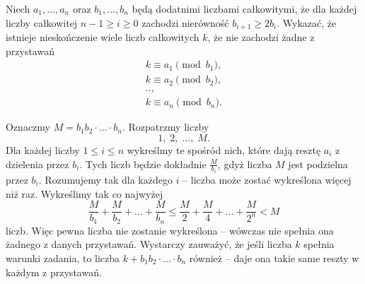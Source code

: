 \begin{problem}{6}
	Niech $a_1, ..., a_n$ oraz $b_1, ..., b_n$ będą dodatnimi liczbami całkowitymi, że dla każdej liczby całkowitej $n - 1\geqslant i \geqslant 0$ zachodzi nierówność $b_{i + 1} \geqslant 2b_{i}$. Wykazać, że istnieje nieskończenie wiele liczb całkowitych $k$, że nie zachodzi żadne z przystawań
	\begin{gather*}
		k \equiv a_1 \pmod{b_1}, \\
		k \equiv a_2 \pmod{b_2}, \\
		.., \\
		k \equiv a_n \pmod{b_n}.
	\end{gather*}
\end{problem}

\noindent
Oznaczmy $M = b_1b_2\cdot ... \cdot b_n$. Rozpatrzmy liczby
\[
	1, \; 2, \; ..., \; M.
\]
Dla każdej liczby $1 \leqslant i \leqslant n$ wykreślmy te spośród nich, które dają resztę $a_i$ z dzielenia przez $b_i$. Tych liczb będzie dokładnie $\frac{M}{b_i}$, gdyż liczba $M$ jest podzielna przez $b_i$.  Rozumujemy tak dla każdego $i$ -- liczba może zostać wykreślona więcej niż raz. Wykreślimy tak co najwyżej
\[
	\frac{M}{b_1} + \frac{M}{b_2} + ... + \frac{M}{b_n} \leqslant \frac{M}{2} + \frac{M}{4} + ... + \frac{M}{2^n} < M 
\]
liczb. Więc pewna liczba nie zostanie wykreślona -- wówczas nie spełnia ona żadnego z danych przystawań. Wystarczy zauważyć, że jeśli liczba $k$ spełnia warunki zadania, to liczba $k + b_1b_2\cdot ... \cdot b_n$ również -- daje ona takie same reszty w każdym z przystawań.

